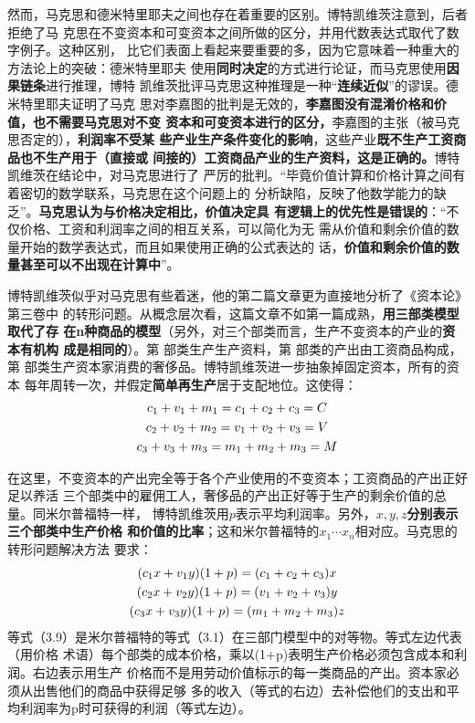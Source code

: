 然而，马克思和德米特里耶夫之间也存在着重要的区别。博特凯维茨注意到，后者拒绝了马
克思在不变资本和可变资本之间所做的区分，并用代数表达式取代了数字例子。这种区别，
比它们表面上看起来要重要的多，因为它意味着一种重大的方法论上的突破：德米特里耶夫
使用\textbf{同时决定}的方式进行论证，而马克思使用\textbf{因果链条}进行推理，博特
凯维茨批评马克思这种推理是一种“\textbf{连续近似}”的谬误。德米特里耶夫证明了马克
思对李嘉图的批判是无效的，\textbf{李嘉图没有混淆价格和价值，也不需要马克思对不变
  资本和可变资本进行的区分，}李嘉图的主张（被马克思否定的），\textbf{利润率不受某
  些产业生产条件变化的影响}，这些产业\textbf{既不生产工资商品也不生产用于（直接或
  间接的）工资商品产业的生产资料，这是正确的。}博特凯维茨在结论中，对马克思进行了
严厉的批判。“毕竟价值计算和价格计算之间有着密切的数学联系，马克思在这个问题上的
分析缺陷，反映了他数学能力的缺乏”。\textbf{马克思认为与价格决定相比，价值决定具
  有逻辑上的优先性是错误的}：“不仅价格、工资和利润率之间的相互关系，可以简化为无
需从价值和剩余价值的数量开始的数学表达式，而且如果使用正确的公式表达的
话，\textbf{价值和剩余价值的数量甚至可以不出现在计算中}”。

博特凯维茨似乎对马克思有些着迷，他的第二篇文章更为直接地分析了《资本论》第三卷中
的转形问题。从概念层次看，这篇文章不如第一篇成熟，\textbf{用三部类模型取代了存
  在n种商品的模型}（另外，对三个部类而言，生产不变资本的产业的\textbf{资本有机构
  成是相同的}）。第 部类生产生产资料，第 部类的产出由工资商品构成，
第 部类生产资本家消费的奢侈品。博特凯维茨进一步抽象掉固定资本，所有的资本
每年周转一次，并假定\textbf{简单再生产}居于支配地位。这使得：
\begin{gather}
  c_1+v_1+m_1=c_1+c_2+c_3=C \notag \\
  c_2+v_2+m_2=v_1+v_2+v_3=V \notag \\
  c_3+v_3+m_3=m_1+m_2+m_3=M 
\end{gather}

在这里，不变资本的产出完全等于各个产业使用的不变资本；工资商品的产出正好足以养活
三个部类中的雇佣工人，奢侈品的产出正好等于生产的剩余价值的总量。同米尔普福特一样，
博特凯维茨用$p$表示平均利润率。另外，\textbf{$x, y, z$分别表示三个部类中生产价格
  和价值的比率}；这和米尔普福特的$x_1 \cdots x_n$相对应。马克思的转形问题解决方法
要求：
\begin{gather}
  (c_1x+v_1y)(1+p)=(c_1+c_2+c_3)x \notag \\
  (c_2x+v_2y)(1+p)=(v_1+v_2+v_3)y \notag \\
  (c_3x+v_3y)(1+p)=(m_1+m_2+m_3)z
\end{gather}
等式（3.9）是米尔普福特的等式（3.1）在三部门模型中的对等物。等式左边代表（用价格
术语）每个部类的成本价格，乘以(1+p)表明生产价格必须包含成本和利润。右边表示用生产
价格而不是用劳动价值标示的每一类商品的产出。资本家必须从出售他们的商品中获得足够
多的收入（等式的右边）去补偿他们的支出和平均利润率为p时可获得的利润（等式左边）。

